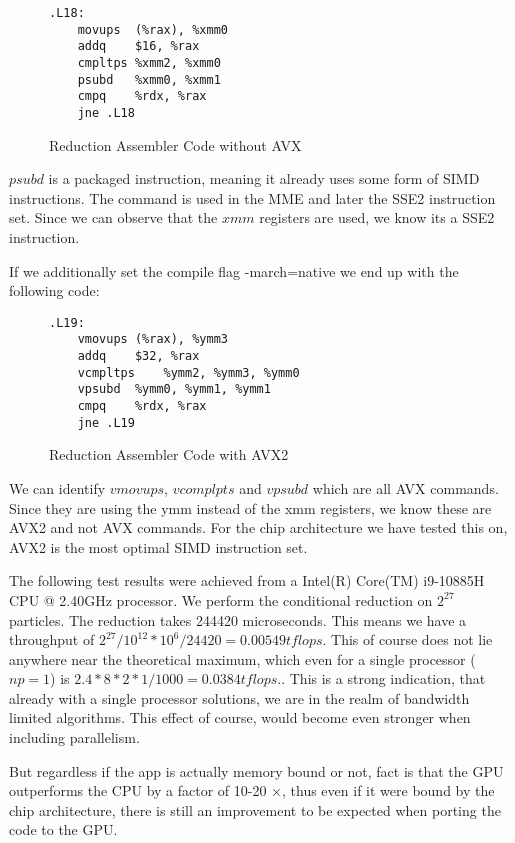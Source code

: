 \documentclass[]{article}
\begin{document}
\begin{figure}[H]
	\begin{lstlisting}
.L18:
	movups	(%rax), %xmm0
	addq	$16, %rax
	cmpltps	%xmm2, %xmm0
	psubd	%xmm0, %xmm1
	cmpq	%rdx, %rax
	jne	.L18

	\end{lstlisting}
\caption{Reduction Assembler Code without AVX}
\label{fig:assembler}
\end{figure}
$psubd$ is a packaged instruction, meaning it already uses some form of SIMD instructions. The command is used in the MME and later the SSE2 instruction set. Since we can observe that the $xmm$ registers are used, we know its a SSE2 instruction. 

If we additionally set the compile flag -march=native we end up with the following code:

\begin{figure}[H]
\begin{lstlisting}
.L19:
	vmovups	(%rax), %ymm3
	addq	$32, %rax
	vcmpltps	%ymm2, %ymm3, %ymm0
	vpsubd	%ymm0, %ymm1, %ymm1
	cmpq	%rdx, %rax
	jne	.L19	

\end{lstlisting}
\caption{Reduction Assembler Code with AVX2}
\label{fig:assembler-avx}
\end{figure}

We can identify $vmovups$, $vcomplpts$ and $vpsubd$ which are all AVX commands. Since they are using the ymm instead of the xmm registers, we know these are AVX2 and not AVX commands. For the chip architecture we have tested this on, AVX2 is the most optimal SIMD instruction set.

The following test results were achieved from a Intel(R) Core(TM) i9-10885H CPU @ 2.40GHz
processor. We perform the conditional reduction on  $2^{27}$ particles. The reduction takes 244420 microseconds. This means we have a throughput of $2^{27} / 10^{12} * 10^6 / 24420 = 0.00549 tflops$. This of course does not lie anywhere near the theoretical maximum, which even for a single processor ($np = 1$) is $2.4 * 8 * 2 * 1 / 1000 = 0.0384 tflops.$. This is a strong indication, that already with a single processor solutions, we are in the realm of bandwidth limited algorithms. This effect of course, would become even stronger when including parallelism.

But regardless if the app is actually memory bound or not, fact is that the GPU outperforms the CPU by a factor of 10-20 $\times$, thus even if it were bound by the chip architecture, there is still an improvement to be expected when porting the code to the GPU. 
\end{document}

